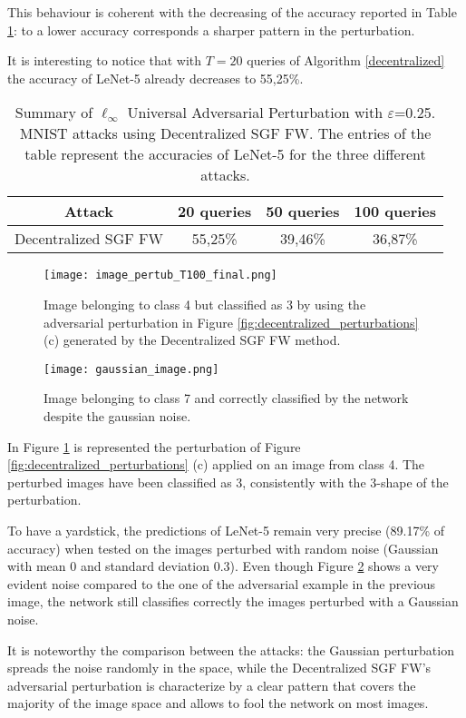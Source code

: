 This behaviour is coherent with the decreasing of the accuracy reported in Table \ref{tab:decentralized}: to a lower accuracy corresponds a sharper pattern in the perturbation.

It is interesting to notice that with $T=20$ queries of Algorithm \ref{decentralized} the accuracy of LeNet-5 already decreases to 55,25\%.
\begin{table}[htbp]
	\begin{center}
		\begin{adjustwidth}{-.6cm}{}
			\begin{tabular}{c|ccc}
				\textbf{Attack} &          20 \textbf{queries} &      50 \textbf{queries} &     100 \textbf{queries} \\
				\midrule
				{\small Decentralized SGF FW}     &    55,25\% &    39,46\% &       36,87\% \\
			\end{tabular}
		\end{adjustwidth}
	\end{center}
	\caption{{\small  Summary of $\ell_\infty$ Universal Adversarial Perturbation with $\varepsilon$=0.25. MNIST attacks using Decentralized SGF FW. The entries of the table represent the accuracies of LeNet-5 for the three different attacks.}}
	\label{tab:decentralized}
\end{table}
\begin{figure}[htbp]
	\centering
	\texttt{[image: image\_pertub\_T100\_final.png]}
	\caption{{\small Image belonging to class 4 but classified as 3 by using the adversarial perturbation in Figure \ref{fig:decentralized_perturbations} (c) generated by the Decentralized SGF FW method.}}
	\label{fig:decentralized}
\end{figure}
\begin{figure}[htbp]
	\centering
	\texttt{[image: gaussian\_image.png]}
	\caption{{\small Image belonging to class 7 and correctly classified by the network despite the gaussian noise.}}
	\label{fig:gaussian_noise}
\end{figure}
In Figure \ref{fig:decentralized} is represented the perturbation of Figure \ref{fig:decentralized_perturbations} (c)
applied on an image from class 4. The perturbed images have been classified as 3, consistently with the 3-shape of the perturbation.

To have a yardstick, the predictions of LeNet-5 remain very precise (89.17\% of accuracy) when tested on the images perturbed with random noise (Gaussian with mean 0 and standard deviation 0.3). Even though Figure \ref{fig:gaussian_noise} shows a very evident noise compared to the one of the adversarial example in the previous image, the network still classifies correctly the images perturbed with a Gaussian noise.

It is noteworthy the comparison between the attacks: the Gaussian perturbation spreads the noise randomly in the space, while the Decentralized SGF FW's adversarial perturbation is characterize by a clear pattern that covers the majority of the image space and allows to fool the network on most images.